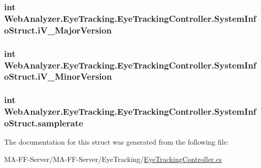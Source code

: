 \subsubsection[{i\+V\+\_\+\+Major\+Version}]{\setlength{\rightskip}{0pt plus 5cm}int Web\+Analyzer.\+Eye\+Tracking.\+Eye\+Tracking\+Controller.\+System\+Info\+Struct.\+i\+V\+\_\+\+Major\+Version}\label{struct_web_analyzer_1_1_eye_tracking_1_1_eye_tracking_controller_1_1_system_info_struct_ab64555809b3f5e516a6248565ee79ac7}
\hypertarget{struct_web_analyzer_1_1_eye_tracking_1_1_eye_tracking_controller_1_1_system_info_struct_ab19d06d21510b7f2bc3c3bd181abe574}{}
\subsubsection[{i\+V\+\_\+\+Minor\+Version}]{\setlength{\rightskip}{0pt plus 5cm}int Web\+Analyzer.\+Eye\+Tracking.\+Eye\+Tracking\+Controller.\+System\+Info\+Struct.\+i\+V\+\_\+\+Minor\+Version}\label{struct_web_analyzer_1_1_eye_tracking_1_1_eye_tracking_controller_1_1_system_info_struct_ab19d06d21510b7f2bc3c3bd181abe574}
\hypertarget{struct_web_analyzer_1_1_eye_tracking_1_1_eye_tracking_controller_1_1_system_info_struct_ad01eaf2951431e56461a816f587d5957}{}
\subsubsection[{samplerate}]{\setlength{\rightskip}{0pt plus 5cm}int Web\+Analyzer.\+Eye\+Tracking.\+Eye\+Tracking\+Controller.\+System\+Info\+Struct.\+samplerate}\label{struct_web_analyzer_1_1_eye_tracking_1_1_eye_tracking_controller_1_1_system_info_struct_ad01eaf2951431e56461a816f587d5957}


The documentation for this struct was generated from the following file\+:\begin{DoxyCompactItemize}
\item 
M\+A-\/\+F\+F-\/\+Server/\+M\+A-\/\+F\+F-\/\+Server/\+Eye\+Tracking/\hyperlink{_eye_tracking_controller_8cs}{Eye\+Tracking\+Controller.\+cs}\end{DoxyCompactItemize}
